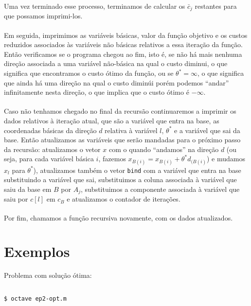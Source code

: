 \documentclass[a4paper]{article}
\begin{document}
Uma vez terminado esse processo, terminamos de calcular os $\bar{c}_{j}$ restantes para que possamos imprimi-los.\paragraph{}
Em seguida, imprimimos as variáveis básicas, valor da função objetivo e os custos reduzidos associados às variáveis não básicas relativos a essa iteração da função. Então verificamos se o programa chegou ao fim, isto é, se não há mais nenhuma direção associada a uma variável não-básica na qual o custo diminui, o que significa que encontramos o custo ótimo da função, ou se $\theta^* = \infty$, o que significa que ainda há uma direção na qual o custo diminúi porém podemos ``andar'' infinitamente nesta direção, o que implica que o custo ótimo é $-\infty$.\paragraph{}
Caso não tenhamos chegado no final da recursão continuaremos a imprimir os dados relativos à iteração atual, que são a variável que entra na base, as coordenadas básicas da direção $d$ relativa à variável $l$, $\theta^*$ e a variável que sai da base. Então atualizamos as variáveis que serão mandadas para o próximo passo da recursão: atualizamos o vetor $x$ com o quando ``andamos'' na direção $d$ (ou seja, para cada variável básica $i$, fazemos $x_{B(i)} = x_{B(i)} +\theta^*d_{(B(i)}$) e mudamos $x_{l}$ para $\theta^*$), atualizamos também o vetor \texttt{bind} com a variável que entra na base substituindo a variável que sai, substituimos a coluna associada à variável que saiu da base em $B$ por $A_{j}$, substituimos a componente associada à variável que saiu por $c[l]$ em $c_{B}$ e atualizamos o contador de iterações.\paragraph{}
Por fim, chamamos a função recursiva novamente, com os dados atualizados.

\section{Exemplos}

\paragraph{}
Problema com solução ótima:

\begin{verbatim}

$ octave ep2-opt.m

\end{verbatim}
\end{document}
